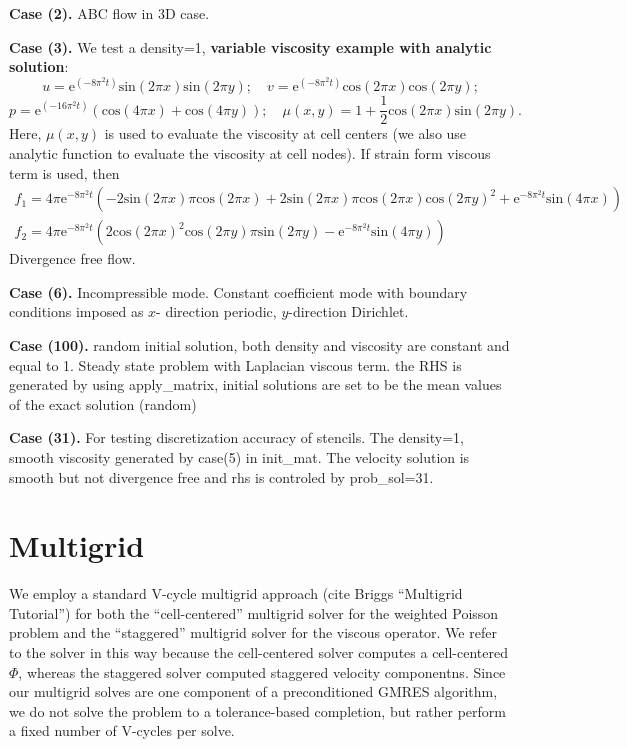 \documentclass[final]{siamltex}
\begin{document}
{\bf Case (2).} ABC flow in 3D case. 

{\bf Case (3).} We test a density=1, {\bf variable viscosity example with analytic solution}: %
$$
u=\mbox{e}^{(-8\pi^2t)}\mbox{sin}(2 \pi x)\mbox{sin}(2 \pi y); \quad v=\mbox{e}^{(-8\pi^2t)}\mbox{cos}(2 \pi x)\mbox{cos}(2 \pi y);
$$
$$
p=\mbox{e}^{(-16 \pi^2 t)}(\mbox{cos}(4 \pi x)+\mbox{cos}(4 \pi y));
\quad
\mu(x,y)=1+\frac{1}{2} \mbox{cos}(2 \pi x) \mbox{sin}(2 \pi y).
$$
Here, $\mu(x,y)$ is used to evaluate the viscosity at cell centers (we also use analytic function to evaluate the viscosity at cell nodes).
If strain form viscous term is used, then 
$$
\begin{array} {ll}
f_1=4 \pi \mbox{e}^{-8 \pi^2 t} (-2 \mbox{sin}(2 \pi x) \pi \mbox{cos}(2 \pi x)+2 \mbox{sin}(2 \pi x) \pi \mbox{cos}(2 \pi x) \mbox{cos}(2 \pi y)^2+\mbox{e}^{-8 \pi^2 t} \mbox{sin}(4 \pi x))
\\
f_2=4 \pi \mbox{e}^{-8 \pi^2 t} (2 \mbox{cos}(2 \pi x)^2 \mbox{cos}(2 \pi y) \pi \mbox{sin}(2 \pi y)-\mbox{e}^{-8 \pi^2 t} \mbox{sin}(4 \pi y))
\end{array}
$$
Divergence free flow.

{\bf Case (6).} Incompressible mode. Constant coefficient mode with boundary conditions imposed as $x$- direction periodic, $y$-direction Dirichlet.


{\bf Case (100).} random initial solution, both density and viscosity are constant and equal to 1. Steady state problem with Laplacian viscous term.
the RHS is generated by using apply\_matrix, initial solutions are set to be the mean values of the exact solution (random) 


{\bf Case (31).} For testing discretization accuracy of stencils. The density=1, smooth viscosity generated by case(5) in init\_mat. 
The velocity solution is smooth but not divergence free and rhs is controled by prob\_sol=31. 

\section{Multigrid}
We employ a standard V-cycle multigrid approach (cite Briggs ``Multigrid Tutorial'') for
both the ``cell-centered'' multigrid solver for the weighted Poisson problem and the
``staggered'' multigrid solver for the viscous operator.  We refer to the solver in this
way because the cell-centered solver computes a cell-centered $\Phi$, whereas the
staggered solver computed staggered velocity componentns.
Since our multigrid solves are one component of a preconditioned
GMRES algorithm, we do not solve the problem to a tolerance-based completion, 
but rather perform a fixed number of V-cycles per solve.
\end{document}
